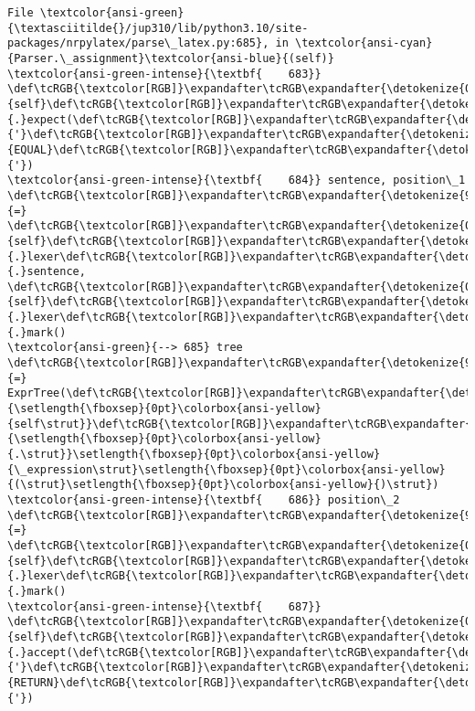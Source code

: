 \documentclass[landscape,letterpaper,10pt,english]{article}
\begin{document}
\begin{Verbatim}[commandchars=\\\{\}, frame=single, framerule=2mm, rulecolor=\color{outerrorbackground}]
File \textcolor{ansi-green}{\textasciitilde{}/jup310/lib/python3.10/site-packages/nrpylatex/parse\_latex.py:685}, in \textcolor{ansi-cyan}{Parser.\_assignment}\textcolor{ansi-blue}{(self)}
\textcolor{ansi-green-intense}{\textbf{    683}} \def\tcRGB{\textcolor[RGB]}\expandafter\tcRGB\expandafter{\detokenize{0,135,0}}{self}\def\tcRGB{\textcolor[RGB]}\expandafter\tcRGB\expandafter{\detokenize{98,98,98}}{.}expect(\def\tcRGB{\textcolor[RGB]}\expandafter\tcRGB\expandafter{\detokenize{175,0,0}}{'}\def\tcRGB{\textcolor[RGB]}\expandafter\tcRGB\expandafter{\detokenize{175,0,0}}{EQUAL}\def\tcRGB{\textcolor[RGB]}\expandafter\tcRGB\expandafter{\detokenize{175,0,0}}{'})
\textcolor{ansi-green-intense}{\textbf{    684}} sentence, position\_1 \def\tcRGB{\textcolor[RGB]}\expandafter\tcRGB\expandafter{\detokenize{98,98,98}}{=} \def\tcRGB{\textcolor[RGB]}\expandafter\tcRGB\expandafter{\detokenize{0,135,0}}{self}\def\tcRGB{\textcolor[RGB]}\expandafter\tcRGB\expandafter{\detokenize{98,98,98}}{.}lexer\def\tcRGB{\textcolor[RGB]}\expandafter\tcRGB\expandafter{\detokenize{98,98,98}}{.}sentence, \def\tcRGB{\textcolor[RGB]}\expandafter\tcRGB\expandafter{\detokenize{0,135,0}}{self}\def\tcRGB{\textcolor[RGB]}\expandafter\tcRGB\expandafter{\detokenize{98,98,98}}{.}lexer\def\tcRGB{\textcolor[RGB]}\expandafter\tcRGB\expandafter{\detokenize{98,98,98}}{.}mark()
\textcolor{ansi-green}{--> 685} tree \def\tcRGB{\textcolor[RGB]}\expandafter\tcRGB\expandafter{\detokenize{98,98,98}}{=} ExprTree(\def\tcRGB{\textcolor[RGB]}\expandafter\tcRGB\expandafter{\detokenize{0,135,0}}{\setlength{\fboxsep}{0pt}\colorbox{ansi-yellow}{self\strut}}\def\tcRGB{\textcolor[RGB]}\expandafter\tcRGB\expandafter{\detokenize{98,98,98}}{\setlength{\fboxsep}{0pt}\colorbox{ansi-yellow}{.\strut}}\setlength{\fboxsep}{0pt}\colorbox{ansi-yellow}{\_expression\strut}\setlength{\fboxsep}{0pt}\colorbox{ansi-yellow}{(\strut}\setlength{\fboxsep}{0pt}\colorbox{ansi-yellow}{)\strut})
\textcolor{ansi-green-intense}{\textbf{    686}} position\_2 \def\tcRGB{\textcolor[RGB]}\expandafter\tcRGB\expandafter{\detokenize{98,98,98}}{=} \def\tcRGB{\textcolor[RGB]}\expandafter\tcRGB\expandafter{\detokenize{0,135,0}}{self}\def\tcRGB{\textcolor[RGB]}\expandafter\tcRGB\expandafter{\detokenize{98,98,98}}{.}lexer\def\tcRGB{\textcolor[RGB]}\expandafter\tcRGB\expandafter{\detokenize{98,98,98}}{.}mark()
\textcolor{ansi-green-intense}{\textbf{    687}} \def\tcRGB{\textcolor[RGB]}\expandafter\tcRGB\expandafter{\detokenize{0,135,0}}{self}\def\tcRGB{\textcolor[RGB]}\expandafter\tcRGB\expandafter{\detokenize{98,98,98}}{.}accept(\def\tcRGB{\textcolor[RGB]}\expandafter\tcRGB\expandafter{\detokenize{175,0,0}}{'}\def\tcRGB{\textcolor[RGB]}\expandafter\tcRGB\expandafter{\detokenize{175,0,0}}{RETURN}\def\tcRGB{\textcolor[RGB]}\expandafter\tcRGB\expandafter{\detokenize{175,0,0}}{'})


\end{Verbatim}
\end{document}
